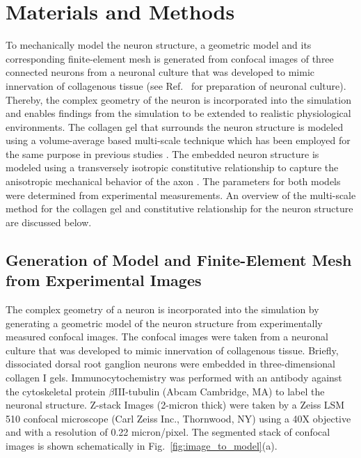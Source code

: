 \documentclass[]{interact}
\begin{document}
\section{Materials and Methods}
\label{sec:materials_and_methods}
To mechanically model the neuron structure, a geometric model and its corresponding finite-element mesh is generated from confocal images of three connected neurons from a neuronal culture that was developed to mimic innervation of collagenous tissue (see Ref.\  for preparation of neuronal culture). Thereby, the complex geometry of the neuron is incorporated into the simulation and enables findings from the simulation to be extended to realistic physiological environments. The collagen gel that surrounds the neuron structure is modeled using a volume-average based multi-scale technique which has been employed for the same purpose in previous studies \citep{Chandran:2007hy,Stylianopoulos:2007dp,Barocas:2007gk,Lai:2012ji,Lake:2012jm}. The embedded neuron structure is modeled using a transversely isotropic constitutive relationship to capture the anisotropic mechanical behavior of the axon \citep{Peter:2012fc}. The parameters for both models were determined from experimental measurements. An overview of the multi-scale method for the collagen gel and constitutive relationship for the neuron structure are discussed below.

\subsection{Generation of Model and Finite-Element Mesh from Experimental Images}
The complex geometry of a neuron is incorporated into the simulation by generating a geometric model of the neuron structure from experimentally measured confocal images. The confocal images were taken from a neuronal culture that was developed to mimic innervation of collagenous tissue. Briefly, dissociated dorsal root ganglion neurons were embedded in three-dimensional collagen I gels. Immunocytochemistry was performed with an antibody against the cytoskeletal protein $\beta$III-tubulin (Abcam Cambridge, MA) to label the neuronal structure. Z-stack Images (2-micron thick) were taken by a Zeiss LSM 510 confocal microscope (Carl Zeiss Inc., Thornwood, NY) using a 40X objective and with a resolution of 0.22 micron/pixel. The segmented stack of confocal images is shown schematically in Fig.\ \ref{fig:image_to_model}(a). 
\end{document}
